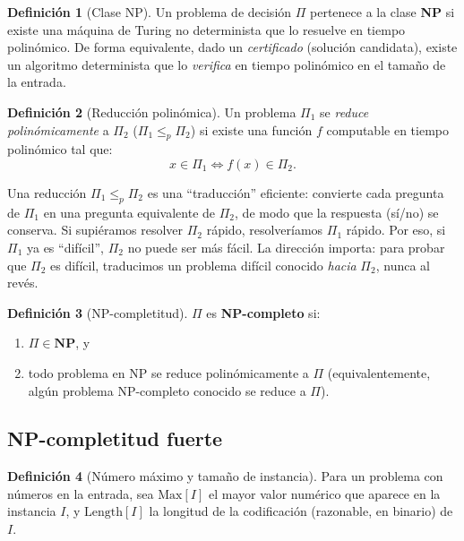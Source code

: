 \documentclass[12pt,a4paper]{article}
\theoremstyle{definition}
\newtheorem{definition}{Definición}
\theoremstyle{remark}
\begin{document}
\begin{definition}[Clase NP]
Un problema de decisión $\Pi$ pertenece a la clase \textbf{NP} si existe
una máquina de Turing no determinista que lo resuelve en tiempo polinómico.
De forma equivalente, dado un \emph{certificado} (solución candidata), existe un
algoritmo determinista que lo \emph{verifica} en tiempo polinómico en el tamaño
de la entrada.
\end{definition}

\begin{definition}[Reducción polinómica]
Un problema $\Pi_1$ se \emph{reduce polinómicamente} a $\Pi_2$
($\Pi_1 \leq_p \Pi_2$) si existe una función $f$ computable en tiempo
polinómico tal que:
\[
  x \in \Pi_1 \iff f(x) \in \Pi_2.
\]
\end{definition}

\begin{intuicion}
Una reducción $\Pi_1 \leq_p \Pi_2$ es una ``traducción'' eficiente: convierte
cada pregunta de $\Pi_1$ en una pregunta equivalente de $\Pi_2$, de modo que la
respuesta (sí/no) se conserva. Si supiéramos resolver $\Pi_2$ rápido, resolveríamos
$\Pi_1$ rápido. Por eso, si $\Pi_1$ ya es ``difícil'', $\Pi_2$ no puede ser más
fácil. La dirección importa: para probar que $\Pi_2$ es difícil, traducimos un
problema difícil conocido \emph{hacia} $\Pi_2$, nunca al revés.
\end{intuicion}

\begin{definition}[NP-completitud]
$\Pi$ es \textbf{NP-completo} si:
\begin{enumerate}
  \item $\Pi \in \mathbf{NP}$, y
  \item todo problema en NP se reduce polinómicamente a $\Pi$
        (equivalentemente, algún problema NP-completo conocido se reduce a $\Pi$).
\end{enumerate}
\end{definition}

\subsection{NP-completitud fuerte}

\begin{definition}[Número máximo y tamaño de instancia]
Para un problema con números en la entrada, sea $\mathrm{Max}[I]$ el mayor valor
numérico que aparece en la instancia $I$, y $\mathrm{Length}[I]$ la longitud de
la codificación (razonable, en binario) de $I$.
\end{definition}
\end{document}
